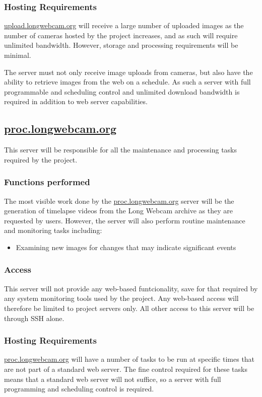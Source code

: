 \documentclass[11pt]{article}
\begin{document}
\subsubsection{Hosting Requirements}
\url{upload.longwebcam.org} will receive a large number of uploaded images as the number of cameras hosted by the project increases, and as such will require unlimited bandwidth. However, storage and processing requirements will be minimal.

The server must not only receive image uploads from cameras, but also have the ability to retrieve images from the web on a schedule. As such a server with full programmable and scheduling control and unlimited download bandwidth is required in addition to web server capabilities.

\subsection{\protect\url{proc.longwebcam.org}}

This server will be responsible for all the maintenance and processing tasks required by the project.

\subsubsection{Functions performed}
The most visible work done by the \url{proc.longwebcam.org} server will be the generation of timelapse videos from the Long Webcam archive as they are requested by users. However, the server will also perform routine maintenance and monitoring tasks including:

\begin{itemize}
    \item Examining new images for changes that may indicate significant events
\end{itemize}


\subsubsection{Access}
This server will not provide any web-based funtcionality, save for that required by any system monitoring tools used by the project. Any web-based access will therefore be limited to project servers only. All other access to this server will be through SSH alone.

\subsubsection{Hosting Requirements}
\url{proc.longwebcam.org} will have a number of tasks to be run at specific times that are not part of a standard web server. The fine control required for these tasks means that a standard web server will not suffice, so a server with full programming and scheduling control is required.
\end{document}
